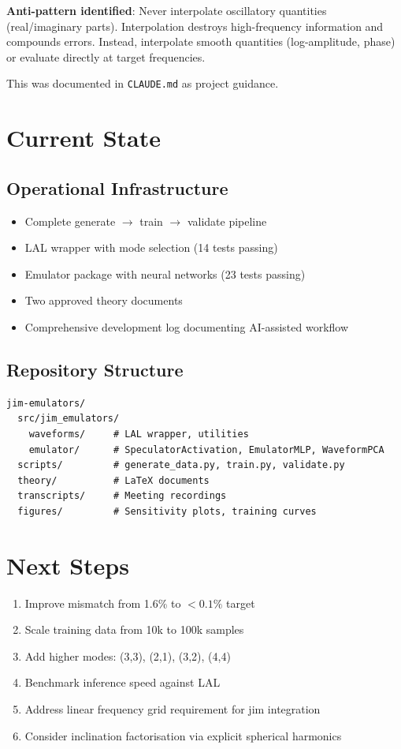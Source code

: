 \documentclass[11pt,a4paper]{article}
\begin{document}
\textbf{Anti-pattern identified}: Never interpolate oscillatory quantities (real/imaginary parts). Interpolation destroys high-frequency information and compounds errors. Instead, interpolate smooth quantities (log-amplitude, phase) or evaluate directly at target frequencies.

This was documented in \texttt{CLAUDE.md} as project guidance.

\section{Current State}

\subsection{Operational Infrastructure}
\begin{itemize}
    \item Complete generate $\to$ train $\to$ validate pipeline
    \item LAL wrapper with mode selection (14 tests passing)
    \item Emulator package with neural networks (23 tests passing)
    \item Two approved theory documents
    \item Comprehensive development log documenting AI-assisted workflow
\end{itemize}

\subsection{Repository Structure}
\begin{verbatim}
jim-emulators/
  src/jim_emulators/
    waveforms/     # LAL wrapper, utilities
    emulator/      # SpeculatorActivation, EmulatorMLP, WaveformPCA
  scripts/         # generate_data.py, train.py, validate.py
  theory/          # LaTeX documents
  transcripts/     # Meeting recordings
  figures/         # Sensitivity plots, training curves
\end{verbatim}

\section{Next Steps}

\begin{enumerate}
    \item Improve mismatch from 1.6\% to $<0.1\%$ target
    \item Scale training data from 10k to 100k samples
    \item Add higher modes: (3,3), (2,1), (3,2), (4,4)
    \item Benchmark inference speed against LAL
    \item Address linear frequency grid requirement for jim integration
    \item Consider inclination factorisation via explicit spherical harmonics
\end{enumerate}
\end{document}

